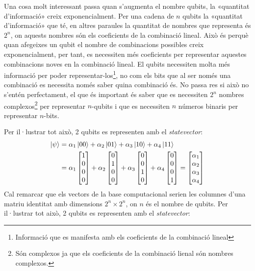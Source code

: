 Una cosa molt interessant passa quan s'augmenta el nombre qubits, la «quantitat d'informació» creix exponencialment. Per una cadena de $n$ qubits la «quantitat d'informació» que té, en altres paraules la quantitat de nombres que representa és $2^n$, on aquests nombres són els coeficients de la combinació lineal. Això és perquè quan afegeixes un qubit el nombre de combinacions possibles creix exponencialment, per tant, es necessiten més coeficients per representar aquestes combinacions noves en la combinació lineal. El qubits necessiten molta més informació per poder representar-los\footnote{Informació que es manifesta amb els coeficients de la combinació lineal}, no com els bits que al ser només una combinació es necessita només saber quina combinació és. No passa res si això no s'entén perfectament, el que és important és saber que es necessiten $2^n$ nombres complexos\footnote{Són complexos ja que els coeficients de la combinació lienal són nombres complexos.} per representar $n$-qubits i que es necessiten $n$ números binaris per representar $n$-bits.

Per il·lustrar tot això, 2 qubits es representen amb el \textit{statevector}:
\begin{align*}
	\ket{\psi} &= \alpha_1\ket{00} + \alpha_2\ket{01} + \alpha_3\ket{10} + \alpha_4\ket{11}\\
	&= \alpha_1\begin{bmatrix} 1 \\ 0 \\ 0 \\ 0 \end{bmatrix} + \alpha_2 \begin{bmatrix} 0 \\ 1 \\ 0 \\ 0 \end{bmatrix} + \alpha_3 \begin{bmatrix} 0 \\ 0 \\ 1 \\ 0 \end{bmatrix} + \alpha_4\begin{bmatrix} 0 \\ 0 \\ 0 \\ 1 \end{bmatrix} 
	= \begin{bmatrix} \alpha_1 \\ \alpha_2 \\ \alpha_3 \\ \alpha_4 \end{bmatrix}
\end{align*}
Cal remarcar que els vectors de la base computacional serien les columnes d'una matriu identitat amb dimensions $2^n\times 2^n$, on $n$ és el nombre de qubits. Per il·lustrar tot això, 2 qubits es representen amb el \textit{statevector}:

